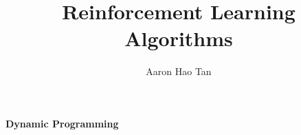 \documentclass{article}
\author{Aaron Hao Tan}
\title{Reinforcement Learning Algorithms}
\date{\vspace{-5ex}}
\begin{document}
\maketitle

\noindent
\textbf{Dynamic Programming}
\end{document}
